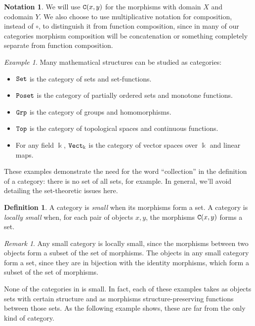 \documentclass[11 pt]{amsart}
\theoremstyle{plain}   %
\theoremstyle{definition}
\newtheorem{defn}{Definition}[section]
\newtheorem{notn}{Notation}[section]
\theoremstyle{remark}
\newtheorem{rem}{Remark}[section]
\newtheorem{ex}{Example}[section]
\numberwithin{equation}{section}
\newcommand{\cat}[1]{{\normalfont\texttt{#1}}}
\begin{document}
\begin{notn} We will use $\cat{C}(x, y)$ for the morphisms with domain $X$ and
	codomain $Y$. We also choose to use multiplicative notation for composition,
	instead of $\circ$, to distinguish it from function composition, since in many
	of our categories morphism composition will be concatenation or something
	completely separate from function composition. \end{notn}

\begin{ex}\label{concrete categories} Many mathematical structures can be studied as categories:
	\begin{itemize}
		\item $\cat{Set}$ is the category of sets and set-functions.
		\item $\cat{Poset}$ is the category of partially ordered sets and
		      monotone functions.
		\item $\cat{Grp}$ is the category of groups and homomorphisms.
		\item $\cat{Top}$ is the category of topological spaces and continuous
		      functions.
		\item For any field $\Bbbk$, $\cat{Vect}_\Bbbk$ is the category of vector
		      spaces over $\Bbbk$ and linear maps.
	\end{itemize}
\end{ex}

These examples demonstrate the need for the word ``collection'' in the
definition of a category: there is no set of all sets, for example. In general,
we'll avoid detailing the set-theoretic issues here.

\begin{defn} A category is \emph{small} when its morphisms
	form a set. A category is \emph{locally small} when, for each pair of objects $x,
		y$, the morphisms $\cat{C}(x, y)$ forms a set. \end{defn}

\begin{rem}
	Any small category is locally small, since the morphisms between two objects
	form a subset of the set of morphisms. The objects in any small category form
	a set, since they are in bijection with the identity morphisms, which form a
	subset of the set of morphisms.
\end{rem}

None of the categories in  is small. In fact, each of
these examples takes as objects sets with certain structure and as morphisms
structure-preserving functions between those sets. As the following example
shows, these are far from the only kind of category.
\end{document}
